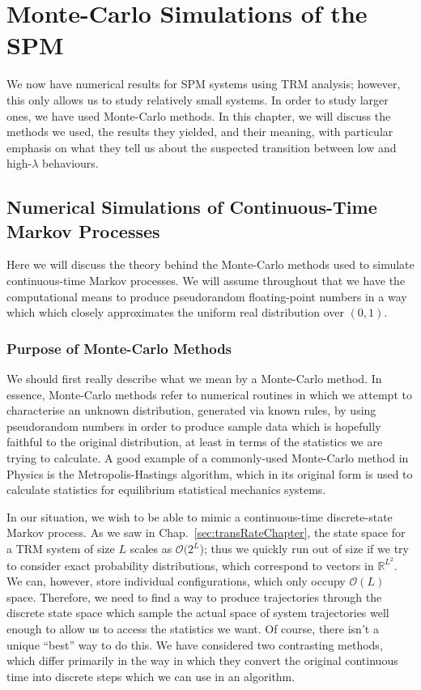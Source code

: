 \chapter{Monte-Carlo Simulations of the SPM} 
\label{sec:numerics}
We now have numerical results for SPM systems using TRM analysis; however, this only allows us to study
relatively small systems. In order to study larger ones, we have used Monte-Carlo methods. In this
chapter, we will discuss the methods we used, the results they yielded, and their meaning, with 
particular emphasis on what they tell us about the suspected transition between low and high-$\lambda$
behaviours.
\section{Numerical Simulations of Continuous-Time Markov Processes}
Here we will discuss the theory behind the Monte-Carlo methods used to simulate continuous-time Markov
processes. We will assume throughout that we have the computational means to produce pseudorandom
floating-point numbers in a way which which closely approximates the uniform real distribution over $(0, 1)$.
\subsection{Purpose of Monte-Carlo Methods}
We should first really describe what we mean by a Monte-Carlo method. In essence, Monte-Carlo methods
refer to numerical routines in which we attempt to characterise an unknown distribution, generated 
via known rules, by using
pseudorandom numbers in order to produce sample data which is hopefully faithful to the original 
distribution, at least in terms of the statistics we are trying to calculate. A good example of a
commonly-used Monte-Carlo method in Physics is the Metropolis-Hastings algorithm, which in its original
form is used to calculate statistics for equilibrium statistical mechanics systems.

In our situation, we wish to be able to mimic a continuous-time discrete-state Markov process.
As we saw in Chap.~\ref{sec:transRateChapter}, the state space for a TRM system of size $L$
scales as
$\mathcal{O}(2^L$); thus we quickly run out of size if we try to consider exact probability distributions, which correspond to
vectors in $\mathbb{R}^{L^2}$. We can, however, store individual configurations, which only occupy
$\mathcal{O}(L)$ space. Therefore, we need to find a way to produce trajectories through the discrete
state space which sample the actual space of system trajectories well enough to allow us to access the
statistics we want. Of course, there isn't a unique ``best'' way to do this. We have considered two
contrasting methods, which differ primarily in the way in which they convert the original continuous 
time into discrete steps which we can use in an algorithm.

